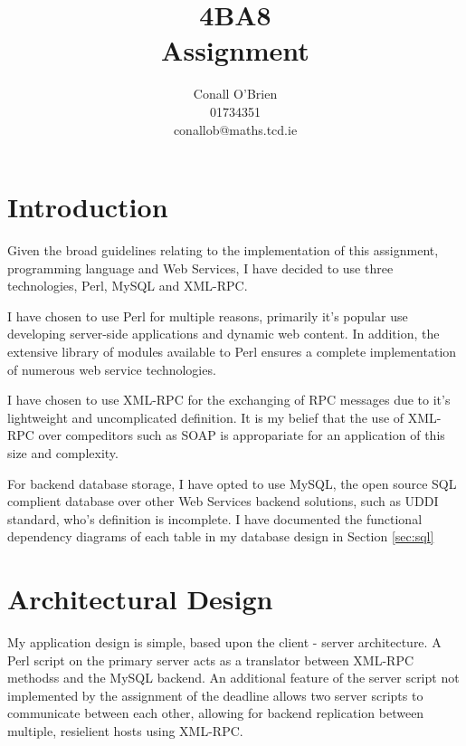 \documentclass[a4paper,10pt]{article}
\begin{document}
\title{4BA8 \\ Assignment}

\author{Conall O'Brien \\ 01734351 \\ conallob@maths.tcd.ie}

\maketitle

\section{Introduction}

Given the broad guidelines relating to the implementation of this 
assignment,  programming language and Web Services, I have decided to 
use three technologies, Perl, MySQL and XML-RPC.


I have chosen to use Perl for multiple reasons, primarily it's
popular use developing server-side applications and dynamic web content.
In addition, the extensive library of modules available to Perl ensures
a complete implementation of numerous web service technologies.


I have chosen to use XML-RPC for the exchanging of RPC messages due to
it's lightweight and uncomplicated definition. It is my belief that the 
use of XML-RPC over compeditors such as SOAP is appropariate for an
application of this size and complexity.


For backend database storage, I have opted to use MySQL, the open source
SQL complient database over other Web Services backend solutions, such 
as UDDI standard, who's definition is incomplete. I have documented the
functional dependency diagrams of each table in my database design in
Section \ref{sec:sql} 

\section{Architectural Design}

My application design is simple, based upon the client - server
architecture. A Perl script on the primary server acts as a translator
between XML-RPC methodss and the MySQL backend. An additional feature of the server script not implemented by the 
assignment of the deadline allows two server scripts to communicate
between each other, allowing for backend replication between multiple,
resielient hosts using XML-RPC.
\end{document}
